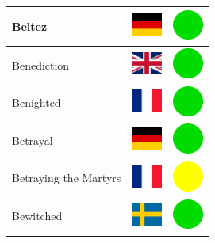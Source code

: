 \documentclass[12pt, a4paper, twoside]{report}
\begin{document}
\begin{center}
\begin{longtable}{|p{5cm}|p{2cm}|p{2cm}|}
 Beltez                                                     & \includegraphics[width=1cm]{../img/flags/de} &   \includegraphics[width=1cm]{../likes/y} \\ \hline
 Benediction                                                & \includegraphics[width=1cm]{../img/flags/gb} &   \includegraphics[width=1cm]{../likes/y} \\ \hline
 Benighted                                                  & \includegraphics[width=1cm]{../img/flags/fr} &   \includegraphics[width=1cm]{../likes/y} \\ \hline
 Betrayal                                                   & \includegraphics[width=1cm]{../img/flags/de} &   \includegraphics[width=1cm]{../likes/y} \\ \hline
 Betraying the Martyrs                                      & \includegraphics[width=1cm]{../img/flags/fr} &   \includegraphics[width=1cm]{../likes/m} \\ \hline
 Bewitched                                                  & \includegraphics[width=1cm]{../img/flags/se} &   \includegraphics[width=1cm]{../likes/y} \\ \hline

\end{longtable}
\end{center}
\end{document}
